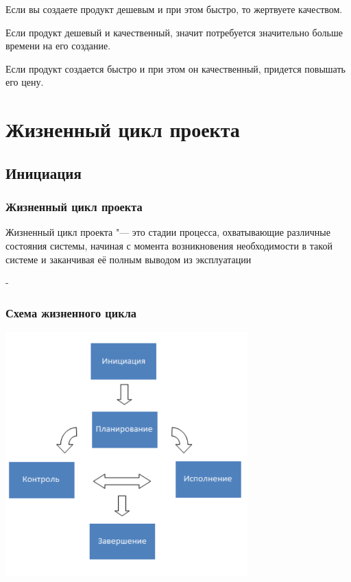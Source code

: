 \documentclass{../industrial-development}
\begin{document}
Если вы создаете продукт дешевым и при этом быстро, то жертвуете качеством.

Если продукт дешевый и качественный, значит потребуется значительно больше времени на его создание.

Если продукт создается быстро и при этом он качественный, придется повышать его цену.
    
    \section{Жизненный цикл проекта}

    \subsection{Инициация}

    \begin{frame} \frametitle{Жизненный цикл проекта}
	\begin{definition}
		\alert{Жизненный цикл проекта} "--- это стадии процесса, охватывающие различные состояния системы, начиная с момента возникновения необходимости в такой системе и заканчивая её полным выводом из эксплуатации
	\end{definition}
    \end{frame}
    \lecturenotes
	-

    \begin{frame} \frametitle{Схема жизненного цикла}
         \centerline{\includegraphics[width=0.7\textwidth]{manageproject.pdf}}
    \end{frame}
    \lecturenotes
\end{document}
